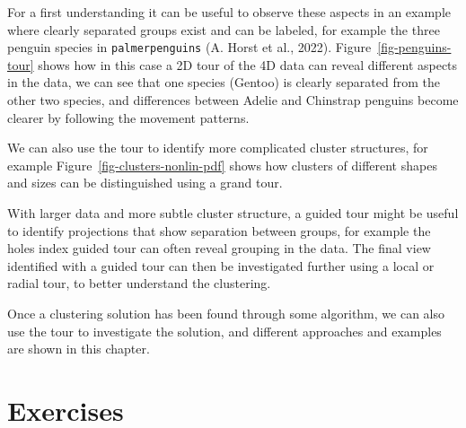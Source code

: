 \documentclass[
  letterpaper,
]{krantz}
\begin{document}
For a first understanding it can be useful to observe these aspects in
an example where clearly separated groups exist and can be labeled, for
example the three penguin species in \texttt{palmerpenguins} (A. Horst
et al., 2022). Figure~\ref{fig-penguins-tour} shows how in this case a
2D tour of the 4D data can reveal different aspects in the data, we can
see that one species (Gentoo) is clearly separated from the other two
species, and differences between Adelie and Chinstrap penguins become
clearer by following the movement patterns.

We can also use the tour to identify more complicated cluster
structures, for example Figure~\ref{fig-clusters-nonlin-pdf} shows how
clusters of different shapes and sizes can be distinguished using a
grand tour.

With larger data and more subtle cluster structure, a guided tour might
be useful to identify projections that show separation between groups,
for example the holes index guided tour can often reveal grouping in the
data. The final view identified with a guided tour can then be
investigated further using a local or radial tour, to better understand
the clustering.

Once a clustering solution has been found through some algorithm, we can
also use the tour to investigate the solution, and different approaches
and examples are shown in this chapter.

\section*{Exercises}\label{exercises-5}

\end{document}
